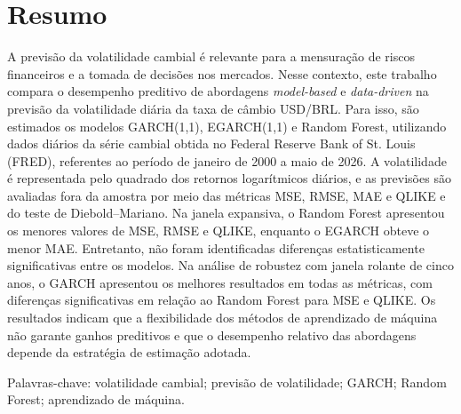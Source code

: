 \documentclass[12pt,a4paper,oneside,openany]{report}
\makeatletter
\def\cleardoublepage{\clearpage\if@twoside\ifodd\c@page\else
  \thispagestyle{empty}\hbox{}\newpage\fi\fi}
\makeatother
\begin{document}
\cleardoublepage
\chapter*{Resumo}
\begin{singlespace}\noindent
A previsão da volatilidade cambial é relevante para a mensuração de riscos financeiros e a tomada de decisões nos mercados. 
Nesse contexto, este trabalho compara o desempenho preditivo de abordagens \textit{model-based} e \textit{data-driven} na previsão da volatilidade 
diária da taxa de câmbio USD/BRL. Para isso, são estimados os modelos GARCH(1,1), EGARCH(1,1) e Random Forest, utilizando dados 
diários da série cambial obtida no Federal Reserve Bank of St. Louis (FRED), referentes ao período de janeiro de 2000 a maio de 2026. 
A volatilidade é representada pelo quadrado dos retornos logarítmicos diários, e as previsões são avaliadas fora da amostra por meio das 
métricas MSE, RMSE, MAE e QLIKE e do teste de Diebold–Mariano. Na janela expansiva, o Random Forest apresentou os menores valores de MSE, 
RMSE e QLIKE, enquanto o EGARCH obteve o menor MAE. Entretanto, não foram identificadas diferenças estatisticamente significativas entre os 
modelos. Na análise de robustez com janela rolante de cinco anos, o GARCH apresentou os melhores resultados em todas as métricas, com 
diferenças significativas em relação ao Random Forest para MSE e QLIKE. Os resultados indicam que a flexibilidade dos métodos de aprendizado 
de máquina não garante ganhos preditivos e que o desempenho relativo das abordagens depende da estratégia de estimação adotada.
\par\vspace{\baselineskip}
\noindent Palavras-chave: volatilidade cambial; previsão de volatilidade; GARCH; Random Forest; aprendizado de máquina.
\end{singlespace}
\end{document}
